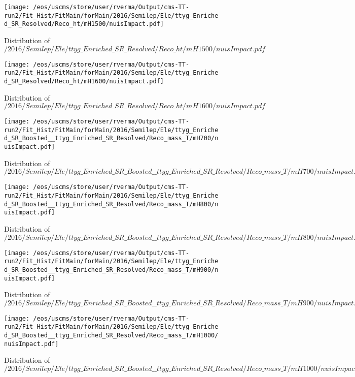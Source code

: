 \begin{figure}
\centering
\texttt{[image: /eos/uscms/store/user/rverma/Output/cms-TT-run2/Fit\_Hist/FitMain/forMain/2016/Semilep/Ele/ttyg\_Enriched\_SR\_Resolved/Reco\_ht/mH1500/nuisImpact.pdf]}
\caption{Distribution of $/2016/Semilep/Ele/ttyg\_Enriched\_SR\_Resolved/Reco\_ht/mH1500/nuisImpact.pdf$}
\end{figure}

\begin{figure}
\centering
\texttt{[image: /eos/uscms/store/user/rverma/Output/cms-TT-run2/Fit\_Hist/FitMain/forMain/2016/Semilep/Ele/ttyg\_Enriched\_SR\_Resolved/Reco\_ht/mH1600/nuisImpact.pdf]}
\caption{Distribution of $/2016/Semilep/Ele/ttyg\_Enriched\_SR\_Resolved/Reco\_ht/mH1600/nuisImpact.pdf$}
\end{figure}

\begin{figure}
\centering
\texttt{[image: /eos/uscms/store/user/rverma/Output/cms-TT-run2/Fit\_Hist/FitMain/forMain/2016/Semilep/Ele/ttyg\_Enriched\_SR\_Boosted\_\_ttyg\_Enriched\_SR\_Resolved/Reco\_mass\_T/mH700/nuisImpact.pdf]}
\caption{Distribution of $/2016/Semilep/Ele/ttyg\_Enriched\_SR\_Boosted\_\_ttyg\_Enriched\_SR\_Resolved/Reco\_mass\_T/mH700/nuisImpact.pdf$}
\end{figure}

\begin{figure}
\centering
\texttt{[image: /eos/uscms/store/user/rverma/Output/cms-TT-run2/Fit\_Hist/FitMain/forMain/2016/Semilep/Ele/ttyg\_Enriched\_SR\_Boosted\_\_ttyg\_Enriched\_SR\_Resolved/Reco\_mass\_T/mH800/nuisImpact.pdf]}
\caption{Distribution of $/2016/Semilep/Ele/ttyg\_Enriched\_SR\_Boosted\_\_ttyg\_Enriched\_SR\_Resolved/Reco\_mass\_T/mH800/nuisImpact.pdf$}
\end{figure}

\begin{figure}
\centering
\texttt{[image: /eos/uscms/store/user/rverma/Output/cms-TT-run2/Fit\_Hist/FitMain/forMain/2016/Semilep/Ele/ttyg\_Enriched\_SR\_Boosted\_\_ttyg\_Enriched\_SR\_Resolved/Reco\_mass\_T/mH900/nuisImpact.pdf]}
\caption{Distribution of $/2016/Semilep/Ele/ttyg\_Enriched\_SR\_Boosted\_\_ttyg\_Enriched\_SR\_Resolved/Reco\_mass\_T/mH900/nuisImpact.pdf$}
\end{figure}

\begin{figure}
\centering
\texttt{[image: /eos/uscms/store/user/rverma/Output/cms-TT-run2/Fit\_Hist/FitMain/forMain/2016/Semilep/Ele/ttyg\_Enriched\_SR\_Boosted\_\_ttyg\_Enriched\_SR\_Resolved/Reco\_mass\_T/mH1000/nuisImpact.pdf]}
\caption{Distribution of $/2016/Semilep/Ele/ttyg\_Enriched\_SR\_Boosted\_\_ttyg\_Enriched\_SR\_Resolved/Reco\_mass\_T/mH1000/nuisImpact.pdf$}
\end{figure}

